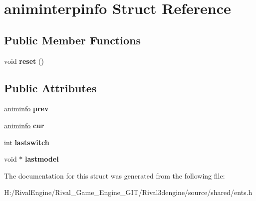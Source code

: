 \hypertarget{structaniminterpinfo}{}\section{animinterpinfo Struct Reference}
\label{structaniminterpinfo}
\subsection*{Public Member Functions}
\begin{DoxyCompactItemize}
\item 
\mbox{\label{structaniminterpinfo_af43e989185beeb83a4b7e376aaa69cc9}} 
void {\bfseries reset} ()
\end{DoxyCompactItemize}
\subsection*{Public Attributes}
\begin{DoxyCompactItemize}
\item 
\mbox{\label{structaniminterpinfo_a0df901b788c8219e3e93d517c44e58b1}} 
\hyperlink{structaniminfo}{animinfo} {\bfseries prev}
\item 
\mbox{\label{structaniminterpinfo_af6df08fada2923854f195b4149a5f8d8}} 
\hyperlink{structaniminfo}{animinfo} {\bfseries cur}
\item 
\mbox{\label{structaniminterpinfo_aec09f6afc6030dc489d12adf139b5b14}} 
int {\bfseries lastswitch}
\item 
\mbox{\label{structaniminterpinfo_a09a5934e6f553e187193739d3a256fba}} 
void $\ast$ {\bfseries lastmodel}
\end{DoxyCompactItemize}


The documentation for this struct was generated from the following file\+:\begin{DoxyCompactItemize}
\item 
H\+:/\+Rival\+Engine/\+Rival\+\_\+\+Game\+\_\+\+Engine\+\_\+\+G\+I\+T/\+Rival3dengine/source/shared/ents.\+h\end{DoxyCompactItemize}
